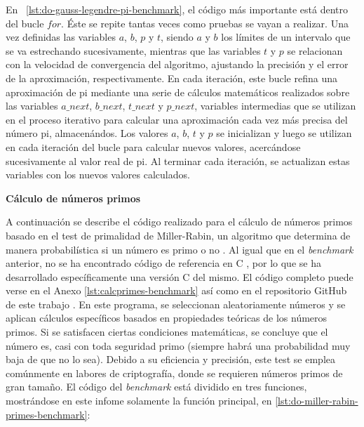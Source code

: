 \par{En ~\ref{lst:do-gauss-legendre-pi-benchmark}, el código más importante está dentro del bucle $for$. Éste se repite tantas veces como pruebas se vayan a realizar. Una vez definidas las variables $a$, $b$, $p$ y $t$, siendo $a$ y $b$ los límites de un intervalo que se va estrechando sucesivamente, mientras que las variables $t$ y $p$ se relacionan con la velocidad de convergencia del algoritmo, ajustando la precisión y el error de la aproximación, respectivamente. En cada iteración, este bucle refina una aproximación de pi mediante una serie de cálculos matemáticos realizados sobre las variables $a\_next$, $b\_next$, $t\_next$ y $p\_next$, variables intermedias que se utilizan en el proceso iterativo para calcular una aproximación cada vez más precisa del número pi, almacenándos. Los valores $a$, $b$, $t$ y $p$ se inicializan y luego se utilizan en cada iteración del bucle para calcular nuevos valores, acercándose sucesivamente al valor real de pi. Al terminar cada iteración, se actualizan estas variables con los nuevos valores calculados.}

\par{\textbf{Cálculo de números primos}}
\par{A continuación se describe el código realizado para el cálculo de números primos basado en el test de primalidad de Miller-Rabin, un algoritmo que determina de manera probabilística si un número es primo o no \cite{calcprimes-referencia}. Al igual que en el \textit{benchmark} anterior, no se ha encontrado código de referencia en C \cite{calcprimes-code}, por lo que se ha desarrollado específicamente una versión C del mismo. El código completo puede verse en el Anexo \ref{lst:calcprimes-benchmark} así como en el repositorio GitHub de este trabajo \cite{repoTFM} \cite{repoTFM-calcprimos}. En este programa, se seleccionan aleatoriamente números y se aplican cálculos específicos basados en propiedades teóricas de los números primos. Si se satisfacen ciertas condiciones matemáticas, se concluye que el número es, casi con toda seguridad primo (siempre habrá una probabilidad muy baja de que no lo sea). Debido a su eficiencia y precisión, este test se emplea comúnmente en labores de criptografía, donde se requieren números primos de gran tamaño. El código del \textit{benchmark} está dividido en tres funciones, mostrándose en este infome solamente la función principal, en \ref{lst:do-miller-rabin-primes-benchmark}:}

